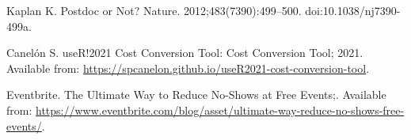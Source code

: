 \documentclass[10pt,letterpaper]{article}
\begin{document}
\begin{thebibliography}{10}
Kaplan K.
\newblock Postdoc or Not?
\newblock Nature. 2012;483(7390):499--500.
\newblock doi:{10.1038/nj7390-499a}.

Canelón S. useR!2021 Cost Conversion Tool: Cost Conversion Tool; 2021.
\newblock Available from:
  \url{https://spcanelon.github.io/useR2021-cost-conversion-tool}.

{Eventbrite}. The Ultimate Way to Reduce No-Shows at Free Events;.
\newblock Available from:
  \url{https://www.eventbrite.com/blog/asset/ultimate-way-reduce-no-shows-free-events/}.

\end{thebibliography}
\end{document}
